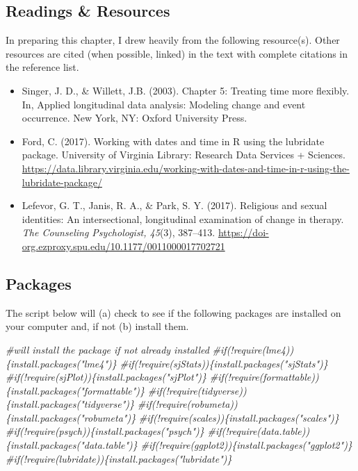 \documentclass[
  11pt,
]{book}
\newenvironment{Shaded}{\begin{snugshade}}{\end{snugshade}}
\newcommand{\CommentTok}[1]{\textcolor[rgb]{0.56,0.35,0.01}{\textit{#1}}}
\providecommand{\tightlist}{%
  \setlength{\itemsep}{0pt}\setlength{\parskip}{0pt}}
\begin{document}
\hypertarget{readings-resources-3}{%
\subsection{Readings \& Resources}\label{readings-resources-3}}

In preparing this chapter, I drew heavily from the following resource(s). Other resources are cited (when possible, linked) in the text with complete citations in the reference list.

\begin{itemize}
\tightlist
\item
  Singer, J. D., \& Willett, J.B. (2003). Chapter 5: Treating time more flexibly. In, Applied longitudinal data analysis: Modeling change and event occurrence. New York, NY: Oxford University Press.
\item
  Ford, C. (2017). Working with dates and time in R using the lubridate package. University of Virginia Library: Research Data Services + Sciences. \url{https://data.library.virginia.edu/working-with-dates-and-time-in-r-using-the-lubridate-package/}
\item
  Lefevor, G. T., Janis, R. A., \& Park, S. Y. (2017). Religious and sexual identities: An intersectional, longitudinal examination of change in therapy. \emph{The Counseling Psychologist, 45}(3), 387--413. \url{https://doi-org.ezproxy.spu.edu/10.1177/0011000017702721}
\end{itemize}

\hypertarget{packages-4}{%
\subsection{Packages}\label{packages-4}}

The script below will (a) check to see if the following packages are installed on your computer and, if not (b) install them.

\begin{Shaded}
\begin{Highlighting}[]
\CommentTok{\#will install the package if not already installed}
\CommentTok{\#if(!require(lme4))\{install.packages("lme4")\}}
\CommentTok{\#if(!require(sjStats))\{install.packages("sjStats")\}}
\CommentTok{\#if(!require(sjPlot))\{install.packages("sjPlot")\}}
\CommentTok{\#if(!require(formattable))\{install.packages("formattable")\}}
\CommentTok{\#if(!require(tidyverse))\{install.packages("tidyverse")\}}
\CommentTok{\#if(!require(robumeta))\{install.packages("robumeta")\}}
\CommentTok{\#if(!require(scales))\{install.packages("scales")\}}
\CommentTok{\#if(!require(psych))\{install.packages("psych")\}}
\CommentTok{\#if(!require(data.table))\{install.packages("data.table")\}}
\CommentTok{\#if(!require(ggplot2))\{install.packages("ggplot2")\}}
\CommentTok{\#if(!require(lubridate))\{install.packages("lubridate")\}}
\end{Highlighting}
\end{Shaded}
\end{document}

